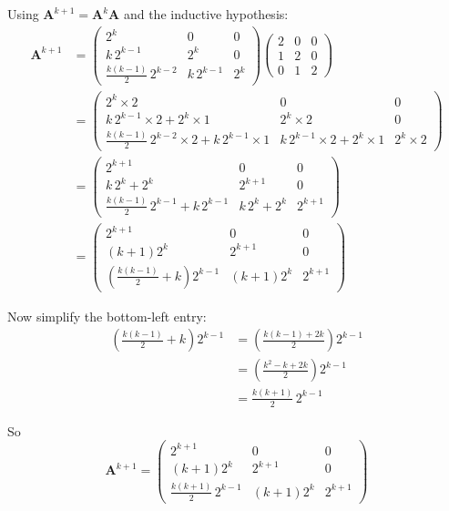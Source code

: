 \documentclass[leqno]{article}
\begin{document}
\begin{enumerate}[
  label=\textbf{\arabic*.},
  leftmargin=*,
  topsep=0pt,
  partopsep=0pt,
  parsep=0pt
]
\begin{djsSolution}
Using \(\mathbf{A}^{k+1}=\mathbf{A}^k\mathbf{A}\) and the inductive hypothesis:
\begin{align*}
\mathbf{A}^{k+1}
&=
\begin{pmatrix}
2^k & 0 & 0\\
k\,2^{k-1} & 2^k & 0\\
\frac{k(k-1)}{2}\,2^{k-2} & k\,2^{k-1} & 2^k
\end{pmatrix}
\begin{pmatrix}
2 & 0 & 0\\
1 & 2 & 0\\
0 & 1 & 2
\end{pmatrix} \\
&=
\begin{pmatrix}
2^k\times 2 & 0 & 0\\[1ex]
k\,2^{k-1}\times 2 + 2^k\times 1 & 2^k\times 2 & 0\\[1ex]
\frac{k(k-1)}{2}\,2^{k-2}\times 2 + k\,2^{k-1}\times 1 &
k\,2^{k-1}\times 2 + 2^k\times 1 &
2^k\times 2
\end{pmatrix} \\
&=
\begin{pmatrix}
2^{k+1} & 0 & 0\\
k\,2^k + 2^k & 2^{k+1} & 0\\
\frac{k(k-1)}{2}\,2^{k-1} + k\,2^{k-1} & k\,2^k + 2^k & 2^{k+1}
\end{pmatrix} \\
&=
\begin{pmatrix}
2^{k+1} & 0 & 0\\
(k+1)2^k & 2^{k+1} & 0\\
\left(\frac{k(k-1)}{2}+k\right)2^{k-1} & (k+1)2^k & 2^{k+1}
\end{pmatrix}
\end{align*}

Now simplify the bottom-left entry:
\begin{align*}
\left(\frac{k(k-1)}{2}+k\right)2^{k-1}
&=
\left(\frac{k(k-1)+2k}{2}\right)2^{k-1} \\
&=
\left(\frac{k^2-k+2k}{2}\right)2^{k-1} \\
&=
\frac{k(k+1)}{2}\,2^{k-1}
\end{align*}

So
\[
\mathbf{A}^{k+1}
=
\begin{pmatrix}
2^{k+1} & 0 & 0\\
(k+1)2^k & 2^{k+1} & 0\\
\frac{k(k+1)}{2}\,2^{k-1} & (k+1)2^k & 2^{k+1}
\end{pmatrix}
\]


\end{djsSolution}
\end{enumerate}
\end{document}
